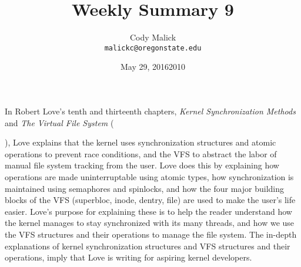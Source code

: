 \documentclass[10pt,letterpaper]{article}
\begin{document}
  \title{Weekly Summary 9}
  \author{Cody Malick\\
  \texttt{malickc@oregonstate.edu}}
  \date{May 29, 2016}
  \maketitle

    In Robert Love's tenth and thirteenth chapters, \textit{Kernel Synchronization Methods}
    and \textit{The Virtual File System} (\date{2010}), Love explains
    that the kernel uses synchronization structures and atomic operations to
    prevent race conditions, and the VFS to abstract the labor of manual file
    system tracking from the user. 
    Love does this by explaining how operations are made uninterruptable using
    atomic types, how synchronization is maintained using semaphores and spinlocks,
    and how the four major building blocks of the VFS (superbloc, inode, dentry, file)
    are used to make the user's life easier.
    Love's purpose for explaining these is to help the reader understand how
    the kernel manages to stay synchronized with its many threads, and how we use the
    VFS structures and their operations to manage the file system.
    The in-depth explanations of kernel synchronization structures and VFS structures
    and their operations, imply that Love is writing for aspiring kernel developers.
\end{document}
